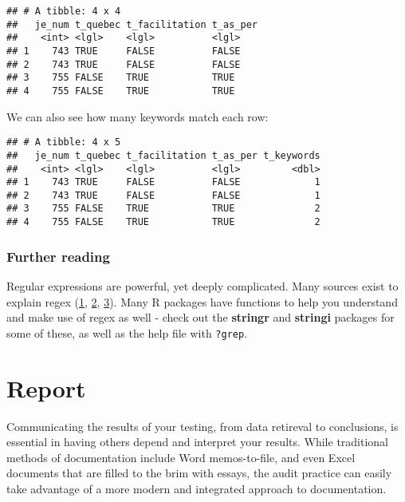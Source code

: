 \documentclass[
]{book}
\newenvironment{Shaded}{\begin{snugshade}}{\end{snugshade}}
\newcommand{\DataTypeTok}[1]{\textcolor[rgb]{0.13,0.29,0.53}{#1}}
\newcommand{\KeywordTok}[1]{\textcolor[rgb]{0.13,0.29,0.53}{\textbf{#1}}}
\newcommand{\NormalTok}[1]{#1}
\newcommand{\OperatorTok}[1]{\textcolor[rgb]{0.81,0.36,0.00}{\textbf{#1}}}
\newcommand{\StringTok}[1]{\textcolor[rgb]{0.31,0.60,0.02}{#1}}
\begin{document}
\begin{verbatim}
## # A tibble: 4 x 4
##   je_num t_quebec t_facilitation t_as_per
##    <int> <lgl>    <lgl>          <lgl>   
## 1    743 TRUE     FALSE          FALSE   
## 2    743 TRUE     FALSE          FALSE   
## 3    755 FALSE    TRUE           TRUE    
## 4    755 FALSE    TRUE           TRUE
\end{verbatim}

We can also see how many keywords match each row:

\begin{Shaded}
\end{Shaded}

\begin{verbatim}
## # A tibble: 4 x 5
##   je_num t_quebec t_facilitation t_as_per t_keywords
##    <int> <lgl>    <lgl>          <lgl>         <dbl>
## 1    743 TRUE     FALSE          FALSE             1
## 2    743 TRUE     FALSE          FALSE             1
## 3    755 FALSE    TRUE           TRUE              2
## 4    755 FALSE    TRUE           TRUE              2
\end{verbatim}

\hypertarget{regex-further}{%
\subsection{Further reading}\label{regex-further}}

Regular expressions are powerful, yet deeply complicated. Many sources exist to explain regex (\href{https://regexone.com}{1}, \href{https://www.regular-expressions.info/quickstart.html}{2}, \href{https://regexr.com}{3}). Many R packages have functions to help you understand and make use of regex as well - check out the \textbf{stringr} and \textbf{stringi} packages for some of these, as well as the help file with \texttt{?grep}.

\hypertarget{report}{%
\chapter{Report}\label{report}}

Communicating the results of your testing, from data retireval to conclusions, is essential in having others depend and interpret your results. While traditional methods of documentation include Word memos-to-file, and even Excel documents that are filled to the brim with essays, the audit practice can easily take advantage of a more modern and integrated approach to documentation.
\end{document}
